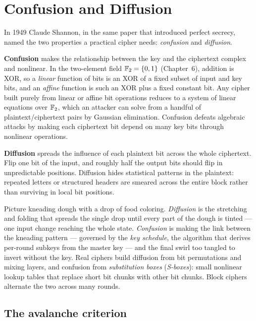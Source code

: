 \section{Confusion and Diffusion}
\label{ch11:confdiff}

In 1949 Claude Shannon, in the same paper that introduced perfect secrecy, named the two properties a practical cipher needs: \emph{confusion} and \emph{diffusion}.

\textbf{Confusion} makes the relationship between the key and the ciphertext complex and nonlinear. In the two-element field $\mathbb{F}_2 = \{0,1\}$ (Chapter~6), addition is XOR, so a \emph{linear} function of bits is an XOR of a fixed subset of input and key bits, and an \emph{affine} function is such an XOR plus a fixed constant bit. Any cipher built purely from linear or affine bit operations reduces to a system of linear equations over $\mathbb{F}_2$, which an attacker can solve from a handful of plaintext/ciphertext pairs by Gaussian elimination. Confusion defeats algebraic attacks by making each ciphertext bit depend on many key bits through nonlinear operations.

\textbf{Diffusion} spreads the influence of each plaintext bit across the whole ciphertext. Flip one bit of the input, and roughly half the output bits should flip in unpredictable positions. Diffusion hides statistical patterns in the plaintext: repeated letters or structured headers are smeared across the entire block rather than surviving in local bit positions.

\begin{intuitionbox}
Picture kneading dough with a drop of food coloring. \emph{Diffusion} is the stretching and folding that spreads the single drop until every part of the dough is tinted --- one input change reaching the whole state. \emph{Confusion} is making the link between the kneading pattern --- governed by the \emph{key schedule}, the algorithm that derives per-round subkeys from the master key --- and the final swirl too tangled to invert without the key. Real ciphers build diffusion from bit permutations and mixing layers, and confusion from \emph{substitution boxes} (\emph{S-boxes}): small nonlinear lookup tables that replace short bit chunks with other bit chunks. Block ciphers alternate the two across many rounds.
\end{intuitionbox}

\subsection{The avalanche criterion}

